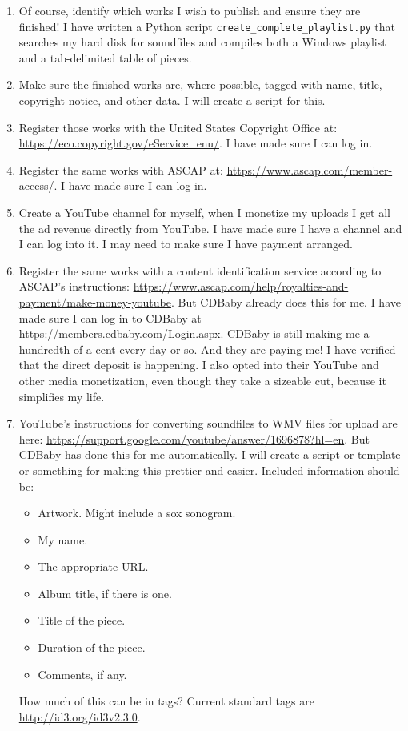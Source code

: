 \documentclass[english,11pt,letterpaper,onecolumn]{scrartcl}
\begin{document}
\begin{enumerate}
\item Of course, identify which works I wish to publish and ensure they are finished! I have written a Python script \texttt{create\_complete\_playlist.py} that searches my hard disk for soundfiles and compiles both a Windows playlist and a tab-delimited table of pieces.
\item Make sure the finished works are, where possible, tagged with name, title, copyright notice, and other data. I will create a script for this.
\item Register those works with the United States Copyright Office at: \url{https://eco.copyright.gov/eService_enu/}. I have made sure I can log in.
\item Register the same works with ASCAP at: \url{https://www.ascap.com/member-access/}. I have made sure I can log in.
\item Create a YouTube channel for myself, when I monetize my uploads I get all the ad revenue directly from YouTube. I have made sure I have a channel and I can log into it. I may need to make sure I have payment arranged.
\item Register the same works with a content identification service according to ASCAP's instructions: \url{https://www.ascap.com/help/royalties-and-payment/make-money-youtube}. But CDBaby already does this for me. I have made sure I can log in to CDBaby at \url{https://members.cdbaby.com/Login.aspx}. CDBaby is still making me a hundredth of a cent every day or so. And they are paying me! I have verified that the direct deposit is happening. I also opted into their YouTube and other media monetization, even though they take a sizeable cut, because it simplifies my life.
\item YouTube's instructions for converting soundfiles to WMV files for upload are here: \url{https://support.google.com/youtube/answer/1696878?hl=en}. But CDBaby has done this for me automatically. I will create a script or template or something for making this prettier and easier. Included information should be:
\begin{itemize}
\item Artwork. Might include a sox sonogram.
\item My name.
\item The appropriate URL.
\item Album title, if there is one.
\item Title of the piece.
\item Duration of the piece.
\item Comments, if any.
\end{itemize}
\noindent How much of this can be in tags? Current standard tags are \url{http://id3.org/id3v2.3.0}.
\end{enumerate}
\end{document}
